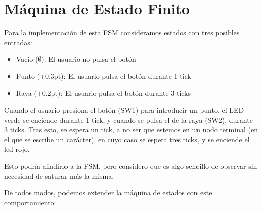 \documentclass[a4paper,openright,12pt]{article}
\newcommand{\punto}{\kern+0.3pt\raisebox{0.35ex}{\huge\textbf.}}
\newcommand{\raya}{\kern+0.2pt\raisebox{-0.35ex}{\huge\textbf-}}
\begin{document}
\section{Máquina de Estado Finito}
Para la implementación de esta FSM consideramos estados con tres posibles entradas:
\begin{itemize}
    \item Vacío ($\emptyset$): El usuario no pulsa el botón
    \item Punto (\punto): El usuario pulsa el botón durante 1 tick
    \item Raya (\raya): El usuario pulsa el botón durante 3 ticks
\end{itemize}

Cuando el usuario presiona el botón (SW1) para introducir un punto, el LED verde se enciende durante 1 tick, y cuando se pulsa el de la raya (SW2), durante 3 ticks.
Tras esto, se espera un tick, a no ser que estemos en un nodo terminal (en el que se escribe un carácter), en cuyo caso se espera tres ticks, y se enciende el led rojo.

Esto podría añadirlo a la FSM, pero considero que es algo sencillo de observar sin necesidad de saturar más la misma.

De todos modos, podemos extender la máquina de estados con este comportamiento:

\begin{center}
\end{center}
\end{document}

